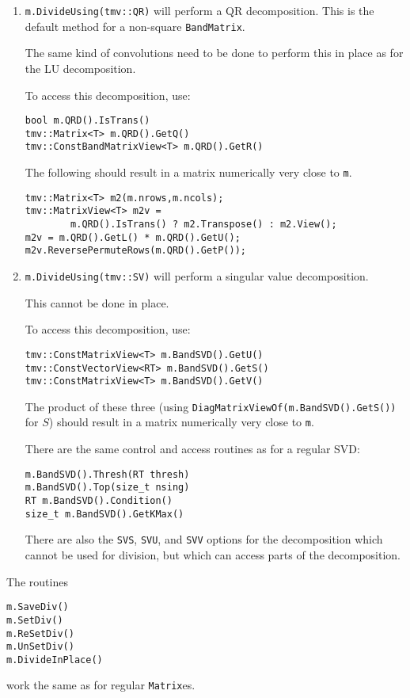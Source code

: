 \documentclass[twoside,letterpaper,11pt]{article}
\renewcommand{\tt}[1]{{\texttt {#1}}}
\begin{document}
\begin{enumerate}
\item
\tt{m.DivideUsing(tmv::QR)} will perform a QR decomposition.  
This is the default method for a non-square \tt{BandMatrix}.

The same kind of convolutions need to be done to perform this in place as 
for the LU decomposition.

To access this decomposition, use:
\begin{verbatim}
bool m.QRD().IsTrans()
tmv::Matrix<T> m.QRD().GetQ()
tmv::ConstBandMatrixView<T> m.QRD().GetR()
\end{verbatim}
The following should result in a matrix numerically very close to \tt{m}.
\begin{verbatim}
tmv::Matrix<T> m2(m.nrows,m.ncols);
tmv::MatrixView<T> m2v = 
        m.QRD().IsTrans() ? m2.Transpose() : m2.View();
m2v = m.QRD().GetL() * m.QRD().GetU();
m2v.ReversePermuteRows(m.QRD().GetP());
\end{verbatim}

\item
\tt{m.DivideUsing(tmv::SV)} will perform a singular value decomposition.

This cannot be done in place.

To access this decomposition, use:
\begin{verbatim}
tmv::ConstMatrixView<T> m.BandSVD().GetU()
tmv::ConstVectorView<RT> m.BandSVD().GetS()
tmv::ConstMatrixView<T> m.BandSVD().GetV()
\end{verbatim}
The product of these three (using \tt{DiagMatrixViewOf(m.BandSVD().GetS())} 
for $S$)
should result in a matrix numerically very close to \tt{m}.

There are the same control and access routines as for a regular SVD:
\begin{verbatim}
m.BandSVD().Thresh(RT thresh)
m.BandSVD().Top(size_t nsing)
RT m.BandSVD().Condition()
size_t m.BandSVD().GetKMax()
\end{verbatim}

There are also the \tt{SVS}, \tt{SVU}, and \tt{SVV} options for the decomposition
which cannot be used for division, but which can access parts of the decomposition.

\end{enumerate}

The routines 
\begin{verbatim}
m.SaveDiv()
m.SetDiv()
m.ReSetDiv()
m.UnSetDiv()
m.DivideInPlace()
\end{verbatim}
work the same as for regular \tt{Matrix}es.
\end{document}
